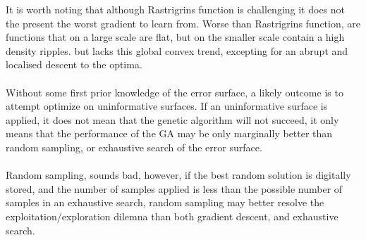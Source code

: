    It is worth noting that although Rastrigrins function is challenging it does not the present the worst gradient to learn from. Worse than Rastrigrins function, are functions that on a large scale are flat, but on the smaller scale contain a high density ripples.
   but lacks this global convex trend, excepting for an abrupt and localised descent to the optima.\\ 
   \\
   Without some first prior knowledge of the error surface, a likely outcome is to attempt optimize on uninformative surfaces. If an uninformative surface is applied, it does not mean that the genetic algorithm will not succeed, it only means that the performance of the GA may be only marginally better than random sampling, or exhaustive search of the error surface.\\
   \\
   Random sampling, sounds bad, however, if the best random solution is digitally stored, and the number of samples applied is less than the possible number of samples in an exhaustive search, random sampling may better resolve the exploitation/exploration dilemna than both gradient descent, and exhaustive search.
{ \hspace*{\fill} \\}      

